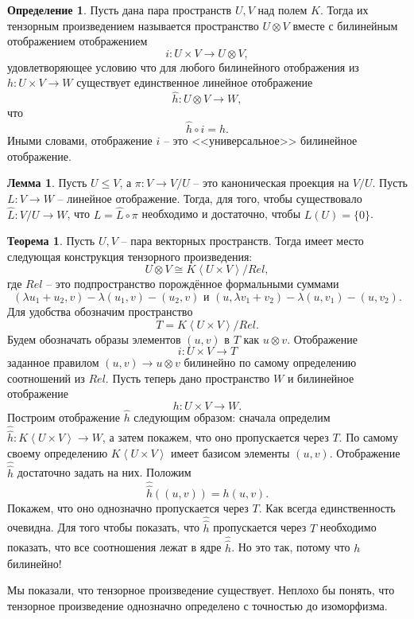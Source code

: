 \documentclass[12pt,a4paper,oneside]{book}
\theoremstyle{definition}
\newtheorem*{defn}{\color{yellow!30!red} Определение}
\newtheorem{thm}{\color{red!40!black}Теорема}
\newtheorem{lem}{\color{green!50!black}Лемма}
\renewcommand{\leq}{\leqslant}
\def\lan{\left\langle }
\def\ran{\right\rangle}
\def\thrm{\begin{thm}}
\def\ethrm{\end{thm}}
\def\dfn{\begin{defn}}
\def\edfn{\end{defn}}
\def\lm{\begin{lem}}
\def\elm{\end{lem}}
\begin{document}
\dfn Пусть дана пара пространств $U,V$ над полем $K$. Тогда их тензорным произведением называется пространство 
$U\otimes V$ вместе с билинейным отображением отображением
$$i \colon U \times  V \to U \otimes V,$$
удовлетворяющее условию что для любого билинейного отображения из $h\colon U \times V \to W$ существует единственное линейное отображение 
$$\hat{h}\colon U\otimes V \to W,$$
что 
$$\hat{h}\circ i=h.$$
Иными словами, отображение $i$ -- это <<универсальное>> билинейное отображение.
\edfn 


\lm Пусть $U\leq V$, а $\pi \colon V \to V/U$ -- это каноническая проекция на $V/U$. Пусть $L\colon V \to W$ -- линейное отображение. Тогда, для того, чтобы существовало $\hat{L}\colon V/U \to W$, что $L=\hat{L}\circ \pi$ необходимо и достаточно, чтобы $L(U)=\{0\}$.
\elm





\thrm Пусть $U,V$ -- пара векторных пространств. Тогда имеет место следующая конструкция тензорного произведения:
$$U \otimes V \cong K\lan U \times V \ran / Rel,$$
где $Rel$ -- это подпространство порождённое формальными суммами
$$(\lambda u_1+u_2, v) - \lambda (u_1, v) - ( u_2,v) \text{ и } (u,\lambda v_1+v_2) - \lambda (u,v_1) - (u,v_2).$$ 
\proof Для удобства обозначим пространство
$$T=K\lan U \times V \ran / Rel.$$ Будем обозначать образы элементов $(u,v)$ в $T$ как  $u\otimes v$. Отображение $$i \colon U\times V \to T$$
заданное правилом  $(u,v) \to u \otimes v$
билинейно по самому определению соотношений из $Rel$. Пусть теперь дано пространство $W$ и билинейное отображение $$h \colon U \times V \to W.$$
Построим отображение $\hat{h}$ следующим образом: сначала определим $\hat{\hat{h}}\colon K\lan U \times V \ran \to W$, а затем покажем, что оно пропускается через $T$. По самому своему определению $K\lan U \times V\ran$ имеет базисом элементы $(u,v)$. Отображение $\hat{\hat{h}}$ достаточно задать на них. Положим $$\hat{\hat{h}}((u,v))=h(u,v).$$
Покажем, что оно однозначно пропускается через $T$. Как всегда единственность очевидна. Для того чтобы показать, что $\hat{\hat{h}}$ пропускается через $T$ необходимо показать, что все соотношения лежат в ядре $\hat{\hat{h}}$. Но это так, потому что $h$ билинейно! 
\endproof
\ethrm




Мы показали, что тензорное произведение существует. Неплохо бы понять, что тензорное произведение однозначно определено с точностью до изоморфизма. 
\end{document}
